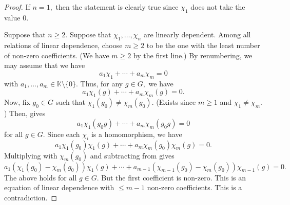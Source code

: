 \dedekindcharacters*\label{thm:dedekindcharacters2}
\begin{flushright}\hyperref[thm:dedekindcharacters]{\upsym}\end{flushright}
\begin{proof}
    If $n = 1,$ then the statement is clearly true since $\chi_1$ does not take the value $0.$

    Suppose that $n \ge 2.$ Suppose that $\chi_1, \ldots, \chi_n$ are linearly dependent. Among all relations of linear dependence, choose $m \ge 2$ to be the one with the least number of non-zero coefficients. (We have $m \ge 2$ by the first line.) By renumbering, we may assume that we have
    \begin{equation*} 
        a_1 \chi_1 + \cdots + a_m \chi_m = 0
    \end{equation*}
    with $a_1, \ldots, a_m \in \mathbb{K} \setminus \{0\}.$ Thus, for any $g \in G,$ we have
    \begin{equation} \label{eq:005}
        a_1 \chi_1(g) + \cdots + a_m \chi_m(g) = 0.
    \end{equation} 
    Now, fix $g_0 \in G$ such that $\chi_1(g_0) \neq \chi_m(g_0).$ (Exists since $m \ge 1$ and $\chi_1 \neq \chi_m.$) Then,  gives
    \begin{equation*} 
        a_1 \chi_1(g_0g) + \cdots + a_m \chi_m(g_0g) = 0
    \end{equation*}
    for all $g \in G.$ Since each $\chi_i$ is a homomorphism, we have
    \begin{equation} \label{eq:006}
        a_1 \chi_1(g_0)\chi_1(g) + \cdots + a_m \chi_m(g_0)\chi_m(g) = 0.
    \end{equation}
    Multiplying  with $\chi_m(g_0)$ and subtracting from  gives
    \begin{equation*} 
        a_1(\chi_1(g_0) - \chi_m(g_0))\chi_1(g) + \cdots + a_{m - 1}(\chi_{m - 1}(g_0) - \chi_{m}(g_0))\chi_{m - 1}(g) = 0.
    \end{equation*}
    The above holds for all $g \in G.$ But the first coefficient is non-zero. This is an equation of linear dependence with $\le m - 1$ non-zero coefficients. This is a contradiction.
\end{proof}


